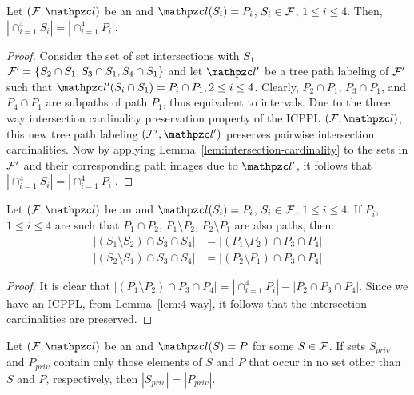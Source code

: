 \begin{lemma}
  \label{lem:4-way}
  Let $(\cF, \cl)$ be an \ICPPL and $\cl(S_i)=P_i$, $S_i \in {\cal F}$, $1
  \leq i \leq 4$.  Then, $|\cap_{i=1}^4 S_i| = |\cap_{i=1}^4 P_i|$.
\end{lemma}
\begin{proof}
  Consider the set of set intersections with $S_1$ ${\cal F}' = \{S_2 \cap S_1, S_3
  \cap S_1, S_4 \cap S_1\}$ and let $\cl'$ be a tree path labeling of
  ${\cal F}'$ such that $\cl'(S_i \cap S_1) = P_i \cap P_1, 2 \le i \le
  4$. Clearly, $P_2 \cap P_1$, $P_3 \cap P_1$, and $P_4 \cap P_1$ are
  subpaths of path $P_1$, thus equivalent to intervals.  Due to the
  three way intersection cardinality preservation property of the
  ICPPL $(\cF, \cl)$, this new tree path labeling $(\cF', \cl')$
  preserves pairwise intersection cardinalities.  Now by applying
  Lemma~\ref{lem:intersection-cardinality} to the sets in ${\cal F}'$ and
  their corresponding path images due to $\cl'$, it follows that
  $|\cap_{i=1}^4 S_i| =| \cap_{i=1}^4 P_i|$.
\end{proof}
\begin{corollary} 
  \label{corr:4-way} 
  Let $(\cF, \cl)$ be an \ICPPL and $\cl(S_i)=P_i$, $S_i \in {\cal F}$, $1
  \leq i \leq 4$. If $P_i$, $1
  \leq i \leq 4$ are such that $P_1 \cap P_2$, $P_1
  \setminus P_2$, $P_2 \setminus P_1$ are also paths, then:
  \begin{align*}
   |(S_1 \setminus S_2) \cap S_3 \cap S_4| &= |(P_1 \setminus P_2) \cap P_3 \cap P_4|\\
   |(S_2 \setminus S_1) \cap S_3 \cap S_4| &= |(P_2 \setminus P_1) \cap P_3 \cap P_4| 
  \end{align*}
\end{corollary}
\begin{proof}
  It is clear that $|(P_1 \setminus P_2) \cap P_3 \cap P_4| =
  |\displaystyle \cap_{i=1}^4 P_i| - | P_2 \cap P_3 \cap P_4|$.  Since
  we have an ICPPL, from Lemma~\ref{lem:4-way}, it follows that the
  intersection cardinalities are preserved.
\end{proof}
\begin{lemma}
  \label{lem:priv-card}
  Let $(\cF, \cl)$ be an \ICPPL and $\cl(S) = P$ for some $S \in {\cal F}$.  If sets
  $S_{priv}$ and $P_{priv}$ contain only those elements of $S$ and $P$
  that occur in no set other than $S$ and $P$, respectively, then
  $|S_{priv}|=|P_{priv}|$.
\end{lemma}
